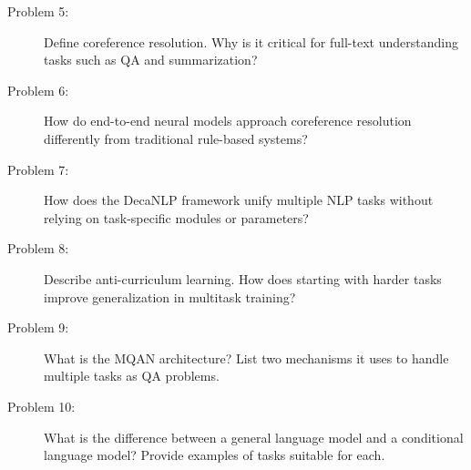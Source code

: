 \documentclass[10pt]{article}
\begin{document}
\begin{description}
\pagebreak

\item[Problem 5:] Define coreference resolution. Why is it critical for full-text understanding tasks such as QA and summarization?

\pagebreak

\item[Problem 6:] How do end-to-end neural models approach coreference resolution differently from traditional rule-based systems?

\pagebreak

\item[Problem 7:] How does the DecaNLP framework unify multiple NLP tasks without relying on task-specific modules or parameters?

\pagebreak

\item[Problem 8:] Describe anti-curriculum learning. How does starting with harder tasks improve generalization in multitask training?

\pagebreak

\item[Problem 9:] What is the MQAN architecture? List two mechanisms it uses to handle multiple tasks as QA problems.

\pagebreak

\item[Problem 10:] What is the difference between a general language model and a conditional language model? Provide examples of tasks suitable for each.

\end{description}
\end{document}
